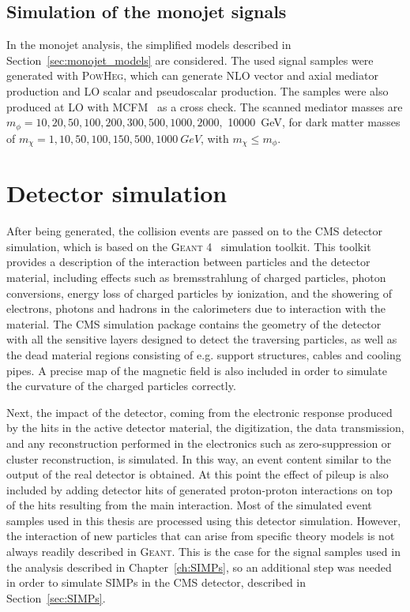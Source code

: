\subsection{Simulation of the monojet signals}
\label{sec:monojet_sim}

In the monojet analysis, the simplified models described in Section~\ref{sec:monojet_models} are considered. The used signal samples were generated with \textsc{PowHeg}, which can generate \ac{NLO} vector and axial mediator production and \ac{LO} scalar and pseudoscalar production. The samples were also produced at \ac{LO} with MCFM~\cite{Campbell:2010ff} as a cross check. The scanned mediator masses are $m_{\phi} = 10, 20, 50, 100, 200, 300, 500, 1000, 2000,$ \SI{10000}{GeV}, for dark matter masses of $m_{\chi} = 1, 10, 50, 100, 150, 500, \SI{1000}{GeV}$, with $m_{\chi} \leq m_{\phi}$.

\section{Detector simulation}
\label{sec:sim}

After being generated, the collision events are passed on to the \ac{CMS} detector simulation, which is based on the \textsc{Geant 4}~\cite{Allison:2006ve} simulation toolkit. This toolkit provides a description of the interaction between particles and the detector material, including effects such as bremsstrahlung of charged particles, photon conversions, energy loss of charged particles by ionization, and the showering of electrons, photons and hadrons in the calorimeters due to interaction with the material. The \ac{CMS} simulation package contains the geometry of the detector with all the sensitive layers designed to detect the traversing particles, as well as the dead material regions consisting of e.g. support structures, cables and cooling pipes. A precise map of the magnetic field is also included in order to simulate the curvature of the charged particles correctly.

Next, the impact of the detector, coming from the electronic response produced by the hits in the active detector material, the digitization, the data transmission, and any reconstruction performed in the electronics such as zero-suppression or cluster reconstruction, is simulated. In this way, an event content similar to the output of the real detector is obtained. At this point the effect of pileup is also included by adding detector hits of generated proton-proton interactions on top of the hits resulting from the main interaction. Most of the simulated event samples used in this thesis are processed using this detector simulation. However, the interaction of new particles that can arise from specific theory models is not always readily described in \textsc{Geant}. This is the case for the signal samples used in the analysis described in Chapter~\ref{ch:SIMPs}, so an additional step was needed in order to simulate \acfp{SIMP} in the \ac{CMS} detector, described in Section~\ref{sec:SIMPs}. 


